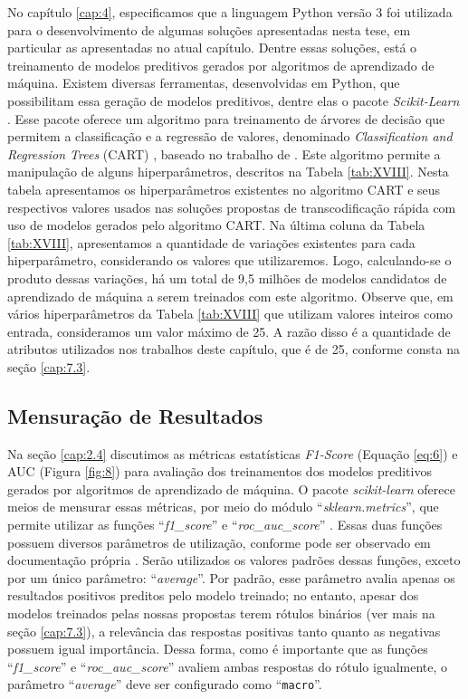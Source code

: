 No capítulo \ref{cap:4}, especificamos que a linguagem Python versão 3 foi utilizada para o desenvolvimento de algumas soluções apresentadas nesta tese, em particular as apresentadas no atual capítulo. Dentre essas soluções, está o treinamento de modelos preditivos gerados por algoritmos de aprendizado de máquina. Existem diversas ferramentas, desenvolvidas em Python, que possibilitam essa geração de modelos preditivos, dentre elas o pacote \textit{Scikit-Learn} \cite{bib:scikitlearn-site}. Esse pacote oferece um algoritmo para treinamento de árvores de decisão que permitem a classificação e a regressão de valores, denominado \textit{Classification and Regression Trees} (CART) \cite{bib:scikitlearn_cart}, baseado no trabalho de \citet{bib:livroCART}. Este algoritmo permite a manipulação de alguns hiperparâmetros, descritos na Tabela \ref{tab:XVIII}. Nesta tabela apresentamos os hiperparâmetros existentes no algoritmo CART e seus respectivos valores usados nas soluções propostas de transcodificação rápida com uso de modelos gerados pelo algoritmo CART. Na última coluna da Tabela \ref{tab:XVIII}, apresentamos a quantidade de variações existentes para cada hiperparâmetro, considerando os valores que utilizaremos. Logo, calculando-se o produto dessas variações, há um total de 9,5 milhões de modelos candidatos de aprendizado de máquina a serem treinados com este algoritmo. Observe que, em vários hiperparâmetros da Tabela \ref{tab:XVIII} que utilizam valores inteiros como entrada, consideramos um valor máximo de 25. A razão disso é a quantidade de atributos utilizados nos trabalhos deste capítulo, que é de 25, conforme consta na seção \ref{cap:7.3}.



\subsection{Mensuração de Resultados}
\label{cap:7.1.4}

Na seção \ref{cap:2.4} discutimos as métricas estatísticas \textit{F1-Score} (Equação \ref{eq:6}) e AUC (Figura \ref{fig:8}) para avaliação dos treinamentos dos modelos preditivos gerados por algoritmos de aprendizado de máquina. O pacote \textit{scikit-learn} oferece meios de mensurar essas métricas, por meio do módulo ``\textit{sklearn.metrics}'', que permite utilizar as funções ``\textit{f1\_score}'' \cite{bib:scikitlearn_f1} e ``\textit{roc\_auc\_score}'' \cite{bib:scikitlearn_auc}. Essas duas funções possuem diversos parâmetros de utilização, conforme pode ser observado em documentação própria \cite{bib:scikitlearn_f1, bib:scikitlearn_auc}. Serão utilizados os valores padrões dessas funções, exceto por um único parâmetro: ``\textit{average}''. Por padrão, esse parâmetro avalia apenas os resultados positivos preditos pelo modelo treinado; no entanto, apesar dos modelos treinados pelas nossas propostas terem rótulos binários (ver mais na seção \ref{cap:7.3}), a relevância das respostas positivas tanto quanto as negativas possuem igual importância. Dessa forma, como é importante que as funções ``\textit{f1\_score}'' e ``\textit{roc\_auc\_score}'' avaliem ambas respostas do rótulo igualmente, o parâmetro ``\textit{average}'' deve ser configurado como ``\texttt{macro}''.

